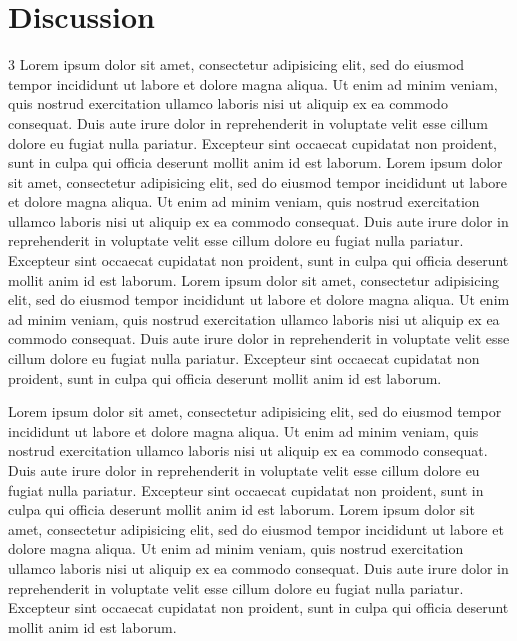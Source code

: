 \documentclass[kulak,landscape]{kulakposter}
\begin{document}
\section*{Discussion}
\begin{multicols}{3}\setlength{\columnseprule}{0pt}
	Lorem ipsum dolor sit amet, consectetur adipisicing elit, sed do eiusmod tempor incididunt ut labore et dolore magna aliqua. Ut enim ad minim veniam, quis nostrud exercitation ullamco laboris nisi ut aliquip ex ea commodo consequat. Duis aute irure dolor in reprehenderit in voluptate velit esse cillum dolore eu fugiat nulla pariatur. Excepteur sint occaecat cupidatat non proident, sunt in culpa qui officia deserunt mollit anim id est laborum. Lorem ipsum dolor sit amet, consectetur adipisicing elit, sed do eiusmod tempor incididunt ut labore et dolore magna aliqua. Ut enim ad minim veniam, quis nostrud exercitation ullamco laboris nisi ut aliquip ex ea commodo consequat. Duis aute irure dolor in reprehenderit in voluptate velit esse cillum dolore eu fugiat nulla pariatur. Excepteur sint occaecat cupidatat non proident, sunt in culpa qui officia deserunt mollit anim id est laborum.
	Lorem ipsum dolor sit amet, consectetur adipisicing elit, sed do eiusmod tempor incididunt ut labore et dolore magna aliqua. Ut enim ad minim veniam, quis nostrud exercitation ullamco laboris nisi ut aliquip ex ea commodo consequat. Duis aute irure dolor in reprehenderit in voluptate velit esse cillum dolore eu fugiat nulla pariatur. Excepteur sint occaecat cupidatat non proident, sunt in culpa qui officia deserunt mollit anim id est laborum.
	
	Lorem ipsum dolor sit amet, consectetur adipisicing elit, sed do eiusmod tempor incididunt ut labore et dolore magna aliqua. Ut enim ad minim veniam, quis nostrud exercitation ullamco laboris nisi ut aliquip ex ea commodo consequat. Duis aute irure dolor in reprehenderit in voluptate velit esse cillum dolore eu fugiat nulla pariatur. Excepteur sint occaecat cupidatat non proident, sunt in culpa qui officia deserunt mollit anim id est laborum. Lorem ipsum dolor sit amet, consectetur adipisicing elit, sed do eiusmod tempor incididunt ut labore et dolore magna aliqua. Ut enim ad minim veniam, quis nostrud exercitation ullamco laboris nisi ut aliquip ex ea commodo consequat. Duis aute irure dolor in reprehenderit in voluptate velit esse cillum dolore eu fugiat nulla pariatur. Excepteur sint occaecat cupidatat non proident, sunt in culpa qui officia deserunt mollit anim id est laborum.
\end{multicols}
\end{document}
